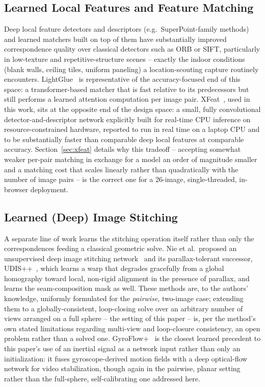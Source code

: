 \documentclass[11pt]{article}
\begin{document}
\subsection{Learned Local Features and Feature Matching}

Deep local feature detectors and descriptors (e.g.\ SuperPoint-family methods) and learned matchers built on top of them have substantially improved correspondence quality over classical detectors such as ORB or SIFT, particularly in low-texture and repetitive-structure scenes -- exactly the indoor conditions (blank walls, ceiling tiles, uniform paneling) a location-scouting capture routinely encounters. LightGlue~\cite{lindenberger2023lightglue} is representative of the accuracy-focused end of this space: a transformer-based matcher that is fast relative to its predecessors but still performs a learned attention computation per image pair. XFeat~\cite{potje2024xfeat}, used in this work, sits at the opposite end of the design space: a small, fully convolutional detector-and-descriptor network explicitly built for real-time CPU inference on resource-constrained hardware, reported to run in real time on a laptop CPU and to be substantially faster than comparable deep local features at comparable accuracy. Section~\ref{sec:xfeat} details why this tradeoff -- accepting somewhat weaker per-pair matching in exchange for a model an order of magnitude smaller and a matching cost that scales linearly rather than quadratically with the number of image pairs -- is the correct one for a 26-image, single-threaded, in-browser deployment.

\subsection{Learned (Deep) Image Stitching}

A separate line of work learns the stitching operation itself rather than only the correspondences feeding a classical geometric solve. Nie et al.\ proposed an unsupervised deep image stitching network~\cite{nie2021udis} and its parallax-tolerant successor, UDIS++~\cite{nie2023udispp}, which learns a warp that degrades gracefully from a global homography toward local, non-rigid alignment in the presence of parallax, and learns the seam-composition mask as well. These methods are, to the authors' knowledge, uniformly formulated for the \emph{pairwise}, two-image case; extending them to a globally-consistent, loop-closing solve over an arbitrary number of views arranged on a full sphere -- the setting of this paper -- is, per the method's own stated limitations regarding multi-view and loop-closure consistency, an open problem rather than a solved one. GyroFlow+~\cite{li2023gyroflow} is the closest learned precedent to this paper's use of an inertial signal as a network input rather than only an initialization: it fuses gyroscope-derived motion fields with a deep optical-flow network for video stabilization, though again in the pairwise, planar setting rather than the full-sphere, self-calibrating one addressed here.
\end{document}
